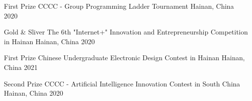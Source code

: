 \begin{cvhonors}

\cvhonor
{First Prize} %
{CCCC - Group Programming Ladder Tournament} %
{Hainan, China} %
{2020} %

\cvhonor
{Gold \& Sliver} %
{The 6th "Internet+" Innovation and Entrepreneurship Competition in Hainan} %
{Hainan, China} %
{2020} %

\cvhonor
{First Prize} %
{Chinese Undergraduate Electronic Design Contest in Hainan} %
{Hainan, China} %
{2021} %

\cvhonor
{Second Prize} %
{CCCC - Artificial Intelligence Innovation Contest in South China} %
{Hainan, China} %
{2020} %


\end{cvhonors}
